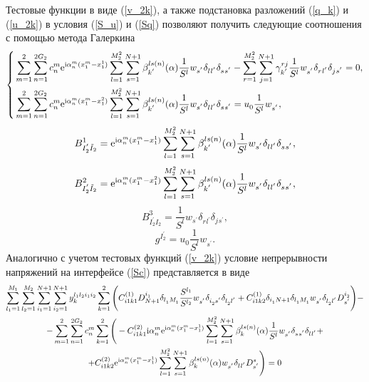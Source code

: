 \documentclass[press]{vestnik}
\begin{document}
Тестовые функции в виде (\ref{v_2k}), а также подстановка разложений (\ref{q_k}) и (\ref{u_2k}) в условия (\ref{S_u}) и (\ref{Sq}) позволяют получить следующие соотношения с помощью метода Галеркина
\begin{equation*}
\left\{
	\begin{aligned}
			&\sum_{m=1}^{2} \sum_{n=1}^{2G_{2}} c_{n}^{m} \mathrm{e}^{ {\rm{i}} {\alpha_{n}^{m}} (x_{1}^{m}-x_{1}^{1})}  \sum_{l=1}^{M_{2}^{2}} \sum_{s=1}^{N+1} \beta_{k^{'}}^{ls(n)}(\alpha) \frac{1}{S^{l}} w_{s^{'}} \delta_{l_{}^{} l_{}^{'}} \delta_{s_{}^{} s_{}^{'}}  -
			\sum_{r=1}^{M_{2}^{2}} \sum_{j=1}^{N+1} \gamma_{k^{'}}^{rj} \frac{1}{S^{l}} w_{s^{'}}^{} \delta_{r_{}^{} l_{}^{'}} \delta_{j_{}^{} s_{}^{'}} = 0, 
			\\
			&\sum_{m=1}^{2} \sum_{n=1}^{2G_{2}} c_{n}^{m} \mathrm{e}^{ {\rm{i}} {\alpha_{n}^{m}} (x_{1}^{m}-x_{1}^{2})}  \sum_{l=1}^{M_{2}^{2}} \sum_{s=1}^{N+1} \beta_{k^{'}}^{ls(n)}(\alpha) \frac{1}{S^{l}} w_{s^{'}} \delta_{l_{}^{} l_{}^{'}} \delta_{s_{}^{} s_{}^{'}} = u_{0}^{} \frac{1}{S^{l}} w_{s^{'}}^{},
		\end{aligned}
\right.
\end{equation*}
\[
		B_{I_{2}^{'}\tilde{I}_{2}}^{1} = \mathrm{e}^{ {\rm{i}} {\alpha_{n}^{m}} (x_{1}^{m}-x_{1}^{1})}  \sum_{l=1}^{M_{2}^{2}} \sum_{s=1}^{N+1} \beta_{k^{'}}^{ls(n)}(\alpha) \frac{1}{S^{l}} w_{s^{'}} \delta_{l_{}^{} l_{}^{'}} \delta_{s_{}^{} s_{}^{'}}, 
\]
\[
		B_{I_{2}^{'}\tilde{I}_{2}}^{2} = \mathrm{e}^{ {\rm{i}} {\alpha_{n}^{m}} (x_{1}^{m}-x_{1}^{2})} \sum_{l=1}^{M_{2}^{2}} \sum_{s=1}^{N+1} \beta_{k^{'}}^{ls(n)}(\alpha) \frac{1}{S^{l}} w_{s^{'}} \delta_{l_{}^{} l_{}^{'}} \delta_{s_{}^{} s_{}^{'}},
\]
\[
		B_{I_{2}^{'}I_{2}^{}}^{3} = \frac{1}{S^{l}} w_{s^{'}} \delta_{r_{}^{} l_{}^{'}} \delta_{j_{}^{} s_{}^{'}},
\]
\[
		g_{}^{I_{2}^{'}} = u_{0}^{} \frac{1}{S^{l}} w_{s^{'}}^{}.
\]
Аналогично с учетом тестовых функций (\ref{v_2k}) условие непрерывности напряжений на интерфейсе (\ref{Sc}) представляется в виде
\begin{multline*}
		\sum_{l_{1}=1}^{M_{1}} \sum_{l_{2}=1}^{M_{2}} \sum_{i_{1}=1}^{N+1} \sum_{i_{2}=1}^{N+1} y_{k}^{l_{1}l_{2}i_{1}i_{2}}  \sum_{k=1}^{2} \Bigg( C_{i1k1}^{(1)} D_{N+1}^{i_{1}^{}} \delta_{l_{1}^{} M_{1}^{}} \frac{S^{l_{1}}}{S^{l_{2}}} w_{s^{'}}^{} \delta_{i_{2}^{} s_{}^{'}} \delta_{l_{2}^{} l_{}^{'}} + C_{i1k2}^{(1)} \delta_{i_{1}^{} N+1} \delta_{l_{1}^{} M_{1}^{}} w_{s^{'}}^{} \delta_{l_{2}^{} l_{}^{'}} D_{s^{'}}^{i_{2}^{}}	
		\Bigg) - 
		\\
		- \sum_{m=1}^{2} \sum_{n=1}^{2G_{2}} c_{n}^{m} \sum_{k=1}^{2}
		\Bigg( -C_{i1k1}^{(2)} {\rm{i}} {\alpha_{n}^{m}} \mathrm{e}^{ {\rm{i}} {\alpha_{n}^{m}} (x_{1}^{m}-x_{1}^{1})} \sum_{l=1}^{M_{2}^{2}} \sum_{s=1}^{N+1} 		\beta_{k^{}}^{ls(n)}(\alpha) \frac{1}{S^{l}} w_{s^{'}}^{} \delta_{s_{}^{} s_{}^{'}} \delta_{l_{}^{} l_{}^{'}} +
		\\
		+ C_{i1k2}^{(2)} \mathrm{e}^{ {\rm{i}} {\alpha_{n}^{m}} (x_{1}^{m}-x_{1}^{1})}  \sum_{l=1}^{M_{2}^{2}} \sum_{s=1}^{N+1} \beta_{k^{}}^{ls(n)}(\alpha) w_{s^{'}}^{} \delta_{l_{}^{} l_{}^{'}} D_{s_{}^{'}}^{s} 
		\Bigg) = 0
\end{multline*}	
\end{document}
